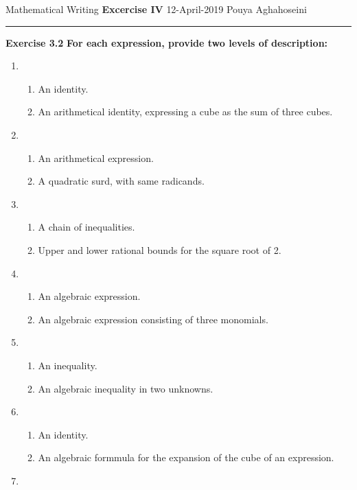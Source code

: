 \documentclass{article}
\begin{document}
\noindent
Mathematical Writing \hfill \textbf{Excercise IV} \newline 
{12-April-2019} \hfill Pouya Aghahoseini

\noindent
\rule{\linewidth}{0.4pt}
\textbf{\large\color{blue} Exercise 3.2}   \textbf{For each expression, provide two levels of description:}

	\begin{enumerate}
		\item 
		\begin{enumerate}[label=\roman*]
			\item  An identity.
			\item An arithmetical identity, expressing a cube as the sum of three cubes.
		\end{enumerate}
	\item
		\begin{enumerate}[label=\roman*]
			\item  An arithmetical expression.
			\item A quadratic surd, with same radicands.
		\end{enumerate}
	\item
		\begin{enumerate}[label=\roman*]
			\item  A chain of inequalities.
			\item Upper and lower rational bounds for the square root of 2.
		\end{enumerate}
	\item
		\begin{enumerate}[label=\roman*]
			\item  An algebraic expression.
			\item  An algebraic expression consisting of three monomials.
		\end{enumerate}
	\item
		\begin{enumerate}[label=\roman*]
			\item  An inequality.
			\item An algebraic inequality in two unknowns.
		\end{enumerate}
		\item
		\begin{enumerate}[label=\roman*]
			\item  An identity.
			\item An algebraic formmula for the expansion of the cube of an expression.
		\end{enumerate}
		\item

\end{enumerate}
\end{document}
